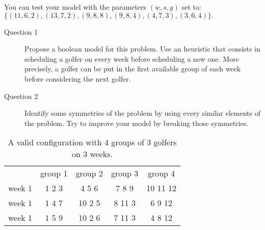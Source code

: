 \begin{note}
You can test your model with the parameters $(w, s, g)$ set to: $\{(11, 6, 2), (13, 7, 2), (9, 8, 8), (9, 8, 4), (4, 7, 3), (3, 6, 4)\}.$
\end{note}

\begin{description}
	\item[Question 1] Propose a boolean model for this problem. Use an heuristic that consists in scheduling a golfer on every week before scheduling a new one. More precisely, a golfer can be put in the first available group of each week before considering the next golfer.
	\item[Question 2] Identify some symmetries of the problem by using every similar elements of the problem. Try to improve your model by breaking those symmetries.
\end{description}

\begin{table}[htbp]
\centering
 	\begin{tabular}{ c c c c c}
		  &  group 1 &  group 2 &  group 3 &  group 4 \\
          \cline{2-5}
		 week 1 &  1 2 3 &  4 5 6 &  7 8 9 &  10 11 12 \\
		 week 1 &  1 4 7 &  10 2 5 &  8 11 3 &  6 9 12 \\
		 week 1 &  1 5 9 &  10 2 6 &  7 11 3 &  4 8 12 \\
	\end{tabular}
\caption{A valid configuration with 4 groups of 3 golfers on 3 weeks.}
\end{table}

